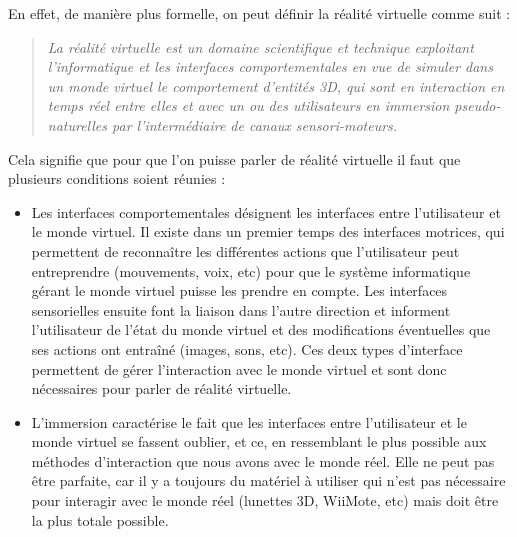 En effet, de manière plus formelle, on peut définir la réalité virtuelle comme suit :\begin{quote}
\og \emph{La réalité virtuelle est un domaine scientifique et technique exploitant l'informatique et les interfaces comportementales en vue de simuler dans un monde virtuel le comportement d'entités 3D, qui sont en interaction en temps réel entre elles et avec un ou des utilisateurs en immersion pseudo-naturelles par l'intermédiaire de canaux sensori-moteurs.} \fg{}
\end{quote}
Cela signifie que pour que l'on puisse parler de réalité virtuelle il faut que plusieurs conditions soient réunies :	
\begin{itemize}
\item Les interfaces comportementales désignent les interfaces entre l'utilisateur et le monde virtuel. Il existe dans un premier temps des interfaces motrices, qui permettent de reconnaître les différentes actions que l'utilisateur peut entreprendre (mouvements, voix, etc) pour que le système informatique gérant le monde virtuel puisse les prendre en compte. Les interfaces sensorielles ensuite font la liaison dans l'autre direction et informent l'utilisateur de l'état du monde virtuel et des modifications éventuelles que ses actions ont entraîné (images, sons, etc). Ces deux types d'interface permettent de gérer l'interaction avec le monde virtuel et sont donc nécessaires pour parler de réalité virtuelle. 
\item L'immersion caractérise le fait que les interfaces entre l'utilisateur et le monde virtuel se fassent oublier, et ce, en ressemblant le plus possible aux méthodes d'interaction que nous avons avec le monde réel. Elle ne peut pas être parfaite, car il y a toujours du matériel à utiliser qui n'est pas nécessaire pour interagir avec le monde réel (lunettes 3D, WiiMote, etc) mais doit être la plus totale possible.\\

\end{itemize}


